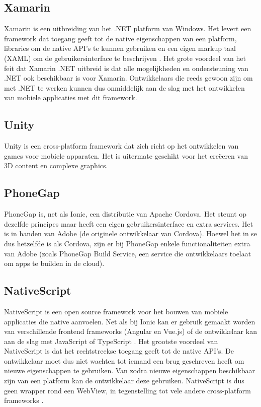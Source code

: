 \subsection{Xamarin}
\label{subsec:Xamarin}

Xamarin is een uitbreiding van het .NET platform van Windows. Het levert een framework dat toegang geeft tot de native eigenschappen van een platform, libraries om de native API's te kunnen gebruiken en een eigen markup taal (XAML) om de gebruikersinterface te beschrijven \autocite{Microsoft2020}. Het grote voordeel van het feit dat Xamarin .NET uitbreid is dat alle mogelijkheden en ondersteuning van .NET ook beschikbaar is voor Xamarin. Ontwikkelaars die reeds gewoon zijn om met .NET te werken kunnen dus onmiddelijk aan de slag met het ontwikkelen van mobiele applicaties met dit framework.

\subsection{Unity}
\label{subsec:Unity}

Unity is een cross-platform framework dat zich richt op het ontwikkelen van games voor mobiele apparaten. Het is uitermate geschikt voor het creëeren van 3D content en complexe graphics. 

\subsection{PhoneGap}
\label{subsec:PhoneGap}

PhoneGap is, net als Ionic, een distributie van Apache Cordova. Het steunt op dezelfde principes maar heeft een eigen gebruikersinterface en extra services. Het is in handen van Adobe (de originele ontwikkelaar van Cordova). Hoewel het in se dus hetzelfde is als Cordova, zijn er bij PhoneGap enkele functionaliteiten extra van Adobe (zoals PhoneGap Build Service, een service die ontwikkelaars toelaat om apps te builden in de cloud).

\subsection{NativeScript} 
\label{subsec:NativeScript}

NativeScript is een open source framework voor het bouwen van mobiele applicaties die native aanvoelen. Net als bij Ionic kan er gebruik gemaakt worden van verschillende frontend frameworks (Angular en Vue.js) of de ontwikkelaar kan aan de slag met JavaScript of TypeScript \autocite{NativeScript2020}. Het grootste voordeel van NativeScript is dat het rechtstreekse toegang geeft tot de native API's. De ontwikkelaar moet dus niet wachten tot iemand een brug geschreven heeft om nieuwe eigenschappen te gebruiken. Van zodra nieuwe eigenschappen beschikbaar zijn van een platform kan de ontwikkelaar deze gebruiken. NativeScript is dus geen wrapper rond een WebView, in tegenstelling tot vele andere cross-platform frameworks \autocite{Anderson2016}.

